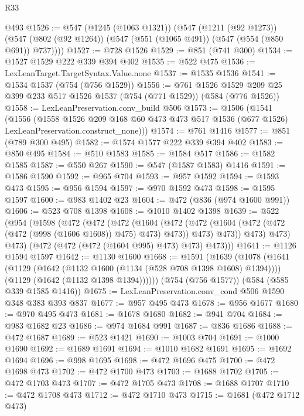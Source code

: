 \begin{lexlean}{R33}
\begin{coremodule}
    @493
@1526 := @547
    (@1245 (@1063 @1321))
    (@547
      (@1211 (@92 @1273))
      (@547 (@802 (@92 @1264)) (@547 (@551 (@1065 @491)) (@547 (@554 (@850 @691)) @737))))
@1527 := @728 @1526
@1529 := @851 (@741 @300)
@1534 := @1527 @1529 @222 @339 @394 @402
@1535 := @522 @475
@1536 := LexLeanTarget.TargetSyntax.Value.none
@1537 := @1535 @1536
@1541 := @1534 @1537 (@754 (@756 @1529))
@1556 := @761
    @1526
    @1529
    @209
    @25
    @399
    @233
    @517
    @1526
    @1537
    (@754 (@771 @1529))
    (@584 (@776 @1526))
@1558 := LexLeanPreservation.conv_build @506
@1573 := @1506
    (@1541
      (@1556
        (@1558
          @1526
          @209
          @168
          @60
          @473
          @473
          @517
          @1536
          (@677 @1526)
          LexLeanPreservation.construct_none)))
@1574 := @761 @1416
@1577 := @851 (@789 @300 @495)
@1582 := @1574 @1577 @222 @339 @394 @402
@1583 := @850 @495
@1584 := @510 @1583
@1585 := @1584 @517
@1586 := @1582 @1585
@1587 := @550 @267
@1590 := @547 (@1587 @1583) @1416
@1591 := @1586 @1590
@1592 := @965 @704
@1593 := @957 @1592
@1594 := @1593 @473
@1595 := @956 @1594
@1597 := @970 @1592 @473
@1598 := @1595 @1597
@1600 := @983 @1402 @23
@1604 := @472 (@836 (@974 @1600 @991))
@1606 := @523 @708 @1398
@1608 := @1010 @1402 @1398
@1639 := @522
    (@954
      (@1598
        (@472
          (@472
            (@472
              (@1604
                (@472
                  (@472 (@1604 (@472 (@472 (@472 (@998 (@1606 @1608)) @475) @473) @473)) @473)
                  @473))
              @473)
            @473)
          @473)
        (@472 (@472 (@472 (@1604 @995) @473) @473) @473)))
@1641 := @1126 @1594 @1597
@1642 := @1130 @1600
@1668 := @1591
    (@1639
      (@1078
        (@1641
          (@1129 (@1642 (@1132 @1600 (@1134 (@528 @708 @1398 @1608) @1394))))
          (@1129 (@1642 (@1132 @1398 @1394))))))
    (@754 (@756 @1577))
    (@584 (@585 @339 @1585 @1416))
@1675 := LexLeanPreservation.conv_cond @506 @1590 @348 @383 @393 @837
@1677 := @957 @495 @473
@1678 := @956 @1677
@1680 := @970 @495 @473
@1681 := @1678 @1680
@1682 := @941 @704
@1684 := @983 @1682 @23
@1686 := @974 @1684 @991
@1687 := @836 @1686
@1688 := @472 @1687
@1689 := @523 @1421
@1690 := @1003 @704
@1691 := @1000 @1690
@1692 := @1689 @1691
@1694 := @1010 @1682 @1691
@1695 := @1692 @1694
@1696 := @998 @1695
@1698 := @472 @1696 @475
@1700 := @472 @1698 @473
@1702 := @472 @1700 @473
@1703 := @1688 @1702
@1705 := @472 @1703 @473
@1707 := @472 @1705 @473
@1708 := @1688 @1707
@1710 := @472 @1708 @473
@1712 := @472 @1710 @473
@1715 := @1681 (@472 @1712 @473)

\end{coremodule}
\end{lexlean}
